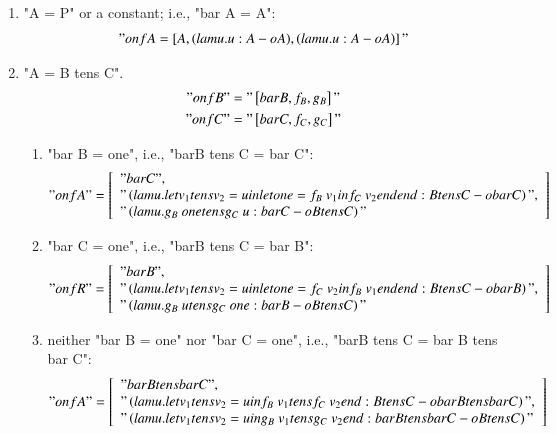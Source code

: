 \documentclass{article}
\begin{document}
\begin{enumerate}
\item "A = P" or a constant; i.e., "bar A = A":
  \begin{gather*}
    "onf A = \left[ A, ( lam u. u : A -o A ), ( lam u. u : A -o A ) \right]"
  \end{gather*}


\item "A = B tens C".
  \begin{align*}
    "onf B" &= "\left[ bar B, f_B, g_B \right]" \\
    "onf C" &= "\left[ bar C, f_C, g_C \right]"
  \end{align*}
  \begin{enumerate}
  \item "bar B = one", i.e., "bar{B tens C} = bar C":
    \begin{gather*}
      "onf A" =
      \left[ \begin{array}{l}
           "bar C", \\
           "\left( lam u. let v_1 tens v_2 = u in let one = f_B\ v_1 in f_C\ v_2 end end : B tens C -o bar C \right)",\\
           "\left( lam u. g_B\ one tens g_C\ u : bar C -o B tens C \right)"
         \end{array} \right]
    \end{gather*}

  \item "bar C = one", i.e., "bar{B tens C} = bar B":
    \begin{gather*}
      "onf R" =
      \left[ \begin{array}{l}
           "bar B", \\
           "\left( lam u. let v_1 tens v_2 = u in let one = f_C\ v_2 in f_B\ v_1 end end : B tens C -o bar B \right)",\\
           "\left( lam u. g_B\ u tens g_C\ one : bar B -o B tens C \right)"
         \end{array} \right]
    \end{gather*}

  \item neither "bar B = one" nor "bar C = one", i.e., "bar{B tens C} = bar B tens bar C":
    \begin{gather*}
      "onf A" =
      \left[ \begin{array}{l}
           "bar B tens bar C", \\
           "\left( lam u. let v_1 tens v_2 = u in f_B\ v_1 tens f_C\ v_2 end : B tens C -o bar B tens bar C \right)",\\
           "\left( lam u. let v_1 tens v_2 = u in g_B\ v_1 tens g_C\ v_2 end : bar B tens bar C -o B tens C \right)"
         \end{array} \right]
    \end{gather*}
  \end{enumerate}



\end{enumerate}
\end{document}

